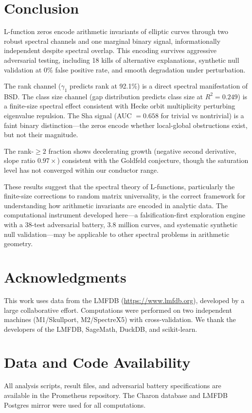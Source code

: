 \documentclass[11pt,a4paper]{article}
\begin{document}
\section{Conclusion}

L-function zeros encode arithmetic invariants of elliptic curves through two robust spectral channels and one marginal binary signal, informationally independent despite spectral overlap. This encoding survives aggressive adversarial testing, including 18 kills of alternative explanations, synthetic null validation at 0\% false positive rate, and smooth degradation under perturbation.

The rank channel ($\gamma_1$ predicts rank at 92.1\%) is a direct spectral manifestation of BSD. The class size channel (gap distribution predicts class size at $R^2 = 0.249$) is a finite-size spectral effect consistent with Hecke orbit multiplicity perturbing eigenvalue repulsion. The Sha signal (AUC $= 0.658$ for trivial vs nontrivial) is a faint binary distinction---the zeros encode whether local-global obstructions exist, but not their magnitude.

The rank-${\geq}2$ fraction shows decelerating growth (negative second derivative, slope ratio $0.97\times$) consistent with the Goldfeld conjecture, though the saturation level has not converged within our conductor range.

These results suggest that the spectral theory of L-functions, particularly the finite-size corrections to random matrix universality, is the correct framework for understanding how arithmetic invariants are encoded in analytic data. The computational instrument developed here---a falsification-first exploration engine with a 38-test adversarial battery, 3.8 million curves, and systematic synthetic null validation---may be applicable to other spectral problems in arithmetic geometry.

\section*{Acknowledgments}

This work uses data from the LMFDB (\url{https://www.lmfdb.org}), developed by a large collaborative effort. Computations were performed on two independent machines (M1/Skullport, M2/SpectreX5) with cross-validation. We thank the developers of the LMFDB, SageMath, DuckDB, and scikit-learn.

\section*{Data and Code Availability}

All analysis scripts, result files, and adversarial battery specifications are available in the Prometheus repository. The Charon database and LMFDB Postgres mirror were used for all computations.
\end{document}
